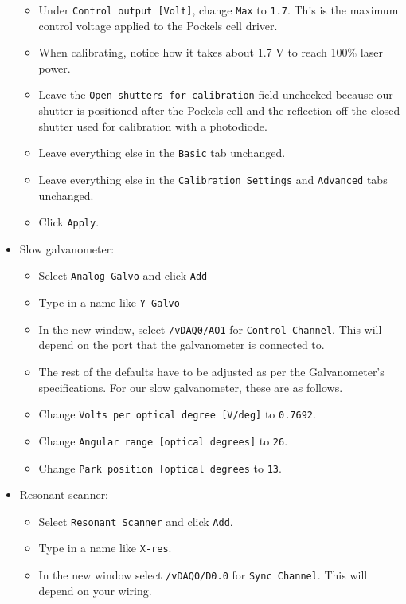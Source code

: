 \documentclass[10pt,letterpaper]{article}
\begin{document}
\begin{itemize}
\begin{itemize}
        \item Under \texttt{Control output [Volt]}, change \texttt{Max} to \texttt{1.7}. This is the maximum control voltage applied to the Pockels cell driver.
        \item When calibrating, notice how it takes about 1.7 V to reach 100\% laser power.
        \item Leave the \texttt{Open shutters for calibration} field unchecked because our shutter is positioned after the Pockels cell and the reflection off the closed shutter used for calibration with a photodiode.
        \item Leave everything else in the \texttt{Basic} tab unchanged.
        \item Leave everything else in the \texttt{Calibration Settings} and \texttt{Advanced} tabs unchanged.
        \item Click \texttt{Apply}.
    \end{itemize}
    \item Slow galvanometer:
    \begin{itemize}
        \item Select \texttt{Analog Galvo} and click \texttt{Add}
        \item Type in a name like \texttt{Y-Galvo}
        \item In the new window, select \texttt{/vDAQ0/AO1} for \texttt{Control Channel}. This will depend on the port that the galvanometer is connected to.
        \item The rest of the defaults have to be adjusted as per the Galvanometer's specifications. For our slow galvanometer, these are as follows.
        \item Change \texttt{Volts per optical degree [V/deg]} to \texttt{0.7692}.
        \item Change \texttt{Angular range [optical degrees]} to \texttt{26}.
        \item Change \texttt{Park position [optical degrees} to \texttt{13}.
    \end{itemize}
    \item Resonant scanner:
    \begin{itemize}
        \item Select \texttt{Resonant Scanner} and click \texttt{Add}.
        \item Type in a name like \texttt{X-res}.
        \item In the new window select \texttt{/vDAQ0/D0.0} for \texttt{Sync Channel}. This will depend on your wiring.

\end{itemize}
\end{itemize}
\end{document}
